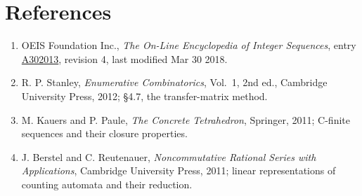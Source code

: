\documentclass[11pt]{article}
\theoremstyle{definition}
\begin{document}
\section{References}

\begin{enumerate}

\item OEIS Foundation Inc., \emph{The On-Line Encyclopedia of Integer Sequences}, entry \href{https://oeis.org/A302013}{A302013}, revision 4, last modified Mar 30 2018.

\item R. P. Stanley, \emph{Enumerative Combinatorics}, Vol.~1, 2nd ed., Cambridge University Press, 2012; \S4.7, the transfer-matrix method.

\item M. Kauers and P. Paule, \emph{The Concrete Tetrahedron}, Springer, 2011; C-finite sequences and their closure properties.

\item J. Berstel and C. Reutenauer, \emph{Noncommutative Rational Series with Applications}, Cambridge University Press, 2011; linear representations of counting automata and their reduction.

\end{enumerate}
\end{document}
